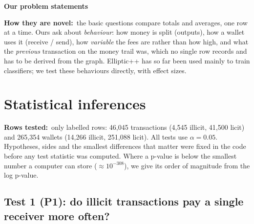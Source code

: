 \documentclass[10pt,a4paper,twocolumn]{article}
\newcommand{\field}[2]{\textbf{#1}~#2\par}
\newcommand{\minihead}[1]{\par\Needspace{8\baselineskip}\smallskip\textbf{#1}\par}
\begin{document}
\minihead{Our problem statements}
\noindent{}

\field{How they are novel:}{the basic questions compare totals and averages, one row at a
time. Ours ask about \emph{behaviour}: how money is split (outputs), how a wallet uses it
(receive / send), how \emph{variable} the fees are rather than how high, and what the
\emph{previous} transaction on the money trail was, which no single row records and has to
be derived from the graph. Elliptic++ has so far been used mainly to train classifiers; we
test these behaviours directly, with effect sizes.}

\section{Statistical inferences}

\field{Rows tested:}{only labelled rows: 46{,}045 transactions (4{,}545 illicit, 41{,}500
licit) and 265{,}354 wallets (14{,}266 illicit, 251{,}088 licit). All tests use
$\alpha=0.05$. Hypotheses, sides and the smallest differences that matter were fixed in the
code before any test statistic was computed. Where a p-value is below the smallest number a
computer can store ($\approx10^{-308}$), we give its order of magnitude from the log
p-value.}


\subsection*{Test 1 (P1): do illicit transactions pay a single receiver more often?}
\end{document}
